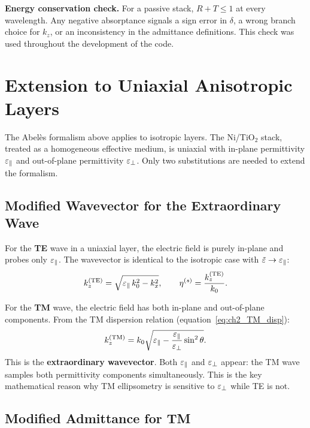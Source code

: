 \begin{resultbox}
\textbf{Energy conservation check.} For a passive stack, $R + T \leq 1$ at
every wavelength. Any negative absorptance signals a sign error in $\delta$,
a wrong branch choice for $k_z$, or an inconsistency in the admittance
definitions. This check was used throughout the development of the code.
\end{resultbox}

\section{Extension to Uniaxial Anisotropic Layers}

The Abelès formalism above applies to isotropic layers. The Ni/TiO$_2$ stack,
treated as a homogeneous effective medium, is uniaxial with in-plane
permittivity $\varepsilon_{\parallel}$ and out-of-plane permittivity $\varepsilon_{\perp}$. Only two
substitutions are needed to extend the formalism.

\subsection{Modified Wavevector for the Extraordinary Wave}

For the \textbf{TE} wave in a uniaxial layer, the electric field is purely
in-plane and probes only $\varepsilon_{\parallel}$. The wavevector is identical to the isotropic
case with $\tilde{\varepsilon} \to \varepsilon_{\parallel}$:
\begin{equation}
  k_{z}^{(\mathrm{TE})} = \sqrt{\varepsilon_{\parallel}\,k_0^2 - k_x^2},
  \qquad \eta^{(s)} = \frac{k_z^{(\mathrm{TE})}}{k_0}.
  \label{eq:ch5_kz_TE}
\end{equation}

For the \textbf{TM} wave, the electric field has both in-plane and out-of-plane
components. From the TM dispersion relation (equation~\eqref{eq:ch2_TM_disp}):
\begin{equation}
  k_{z}^{(\mathrm{TM})} = k_0\sqrt{\varepsilon_{\parallel} - \frac{\varepsilon_{\parallel}}{\varepsilon_{\perp}}\sin^2\theta}.
  \label{eq:ch5_kz_TM}
\end{equation}
This is the \textbf{extraordinary wavevector}. Both $\varepsilon_{\parallel}$ and $\varepsilon_{\perp}$
appear: the TM wave samples both permittivity components simultaneously.
This is the key mathematical reason why TM ellipsometry is sensitive to
$\varepsilon_{\perp}$ while TE is not.

\subsection{Modified Admittance for TM}


